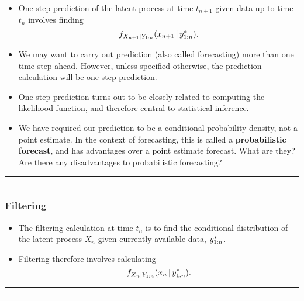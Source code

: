 \documentclass[]{article}
\begin{document}
\begin{itemize}
\item
  One-step prediction of the latent process at time \(t_{n+1}\) given
  data up to time \(t_n\) involves finding
  \[ f_{X_{n+1}|Y_{1:n}}(x_{n+1}{\, | \,} y_{1:n}^*).\]
\item
  We may want to carry out prediction (also called forecasting) more
  than one time step ahead. However, unless specified otherwise, the
  prediction calculation will be one-step prediction.
\item
  One-step prediction turns out to be closely related to computing the
  likelihood function, and therefore central to statistical inference.
\item
  We have required our prediction to be a conditional probability
  density, not a point estimate. In the context of forecasting, this is
  called a \textbf{probabilistic forecast}, and has advantages over a
  point estimate forecast. What are they? Are there any disadvantages to
  probabilistic forecasting?
\end{itemize}

\begin{center}\rule{0.5\linewidth}{\linethickness}\end{center}

\begin{center}\rule{0.5\linewidth}{\linethickness}\end{center}

\subsubsection{Filtering}\label{filtering}

\begin{itemize}
\item
  The filtering calculation at time \(t_n\) is to find the conditional
  distribution of the latent process \(X_n\) given currently available
  data, \(y_{1:n}^*\).
\item
  Filtering therefore involves calculating
  \[f_{X_{n}|Y_{1:n}}(x_n{\, | \,} y_{1:n}^*).\]
\end{itemize}

\begin{center}\rule{0.5\linewidth}{\linethickness}\end{center}

\begin{center}\rule{0.5\linewidth}{\linethickness}\end{center}
\end{document}
